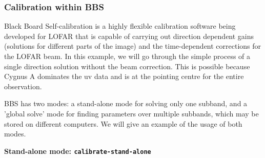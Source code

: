 



%





\subsubsection{Calibration within BBS}

Black Board Self-calibration is a highly flexible calibration software being developed for LOFAR that is capable of carrying out direction dependent gains (solutions for different parts of the image) and the time-dependent corrections for the LOFAR beam. In this example, we will go through the simple process of a single direction solution without the beam correction. This is possible because Cygnus A dominates the uv data and is at the pointing centre for the entire observation.

BBS has two modes: a stand-alone mode for solving only one subband, and a 'global solve' mode for finding parameters over multiple subbands, which may be stored on different computers. We will give an example of the usage of both modes.

\textbf{Stand-alone mode: \texttt{calibrate-stand-alone}}

